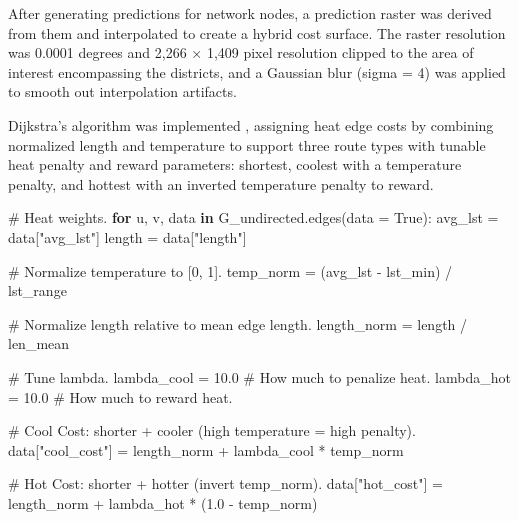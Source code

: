 \documentclass[
]{article}
\newenvironment{Shaded}{\begin{snugshade}}{\end{snugshade}}
\newcommand{\CommentTok}[1]{\textcolor[rgb]{0.37,0.37,0.37}{#1}}
\newcommand{\ControlFlowTok}[1]{\textcolor[rgb]{0.00,0.23,0.31}{\textbf{#1}}}
\newcommand{\FloatTok}[1]{\textcolor[rgb]{0.68,0.00,0.00}{#1}}
\newcommand{\KeywordTok}[1]{\textcolor[rgb]{0.00,0.23,0.31}{\textbf{#1}}}
\newcommand{\NormalTok}[1]{\textcolor[rgb]{0.00,0.23,0.31}{#1}}
\newcommand{\OperatorTok}[1]{\textcolor[rgb]{0.37,0.37,0.37}{#1}}
\newcommand{\StringTok}[1]{\textcolor[rgb]{0.13,0.47,0.30}{#1}}
\newcommand{\VariableTok}[1]{\textcolor[rgb]{0.07,0.07,0.07}{#1}}
\begin{document}
After generating predictions for network nodes, a prediction raster was derived from them and interpolated to create a hybrid cost surface. The raster resolution was 0.0001 degrees and 2,266 × 1,409 pixel resolution clipped to the area of interest encompassing the districts, and a Gaussian blur (sigma = 4) was applied to smooth out interpolation artifacts.

Dijkstra's algorithm was implemented \citep{dijkstra1959}, assigning heat edge costs by combining normalized length and temperature to support three route types with tunable heat penalty and reward parameters: shortest, coolest with a temperature penalty, and hottest with an inverted temperature penalty to reward.

\begin{Shaded}
\begin{Highlighting}[]
\CommentTok{\# Heat weights.}
\ControlFlowTok{for}\NormalTok{ u, v, data }\KeywordTok{in}\NormalTok{ G\_undirected.edges(data }\OperatorTok{=} \VariableTok{True}\NormalTok{):}
\NormalTok{    avg\_lst }\OperatorTok{=}\NormalTok{ data[}\StringTok{"avg\_lst"}\NormalTok{]}
\NormalTok{    length  }\OperatorTok{=}\NormalTok{ data[}\StringTok{"length"}\NormalTok{]}

    \CommentTok{\# Normalize temperature to [0, 1].}
\NormalTok{    temp\_norm }\OperatorTok{=}\NormalTok{ (avg\_lst }\OperatorTok{{-}}\NormalTok{ lst\_min) }\OperatorTok{/}\NormalTok{ lst\_range}

    \CommentTok{\# Normalize length relative to mean edge length.}
\NormalTok{    length\_norm }\OperatorTok{=}\NormalTok{ length }\OperatorTok{/}\NormalTok{ len\_mean}

    \CommentTok{\# Tune lambda.}
\NormalTok{    lambda\_cool }\OperatorTok{=} \FloatTok{10.0} \CommentTok{\# How much to penalize heat.}
\NormalTok{    lambda\_hot  }\OperatorTok{=} \FloatTok{10.0} \CommentTok{\# How much to reward heat.}

    \CommentTok{\# Cool Cost: shorter + cooler (high temperature = high penalty).}
\NormalTok{    data[}\StringTok{"cool\_cost"}\NormalTok{] }\OperatorTok{=}\NormalTok{ length\_norm }\OperatorTok{+}\NormalTok{ lambda\_cool }\OperatorTok{*}\NormalTok{ temp\_norm}

    \CommentTok{\# Hot Cost: shorter + hotter (invert temp\_norm).}
\NormalTok{    data[}\StringTok{"hot\_cost"}\NormalTok{] }\OperatorTok{=}\NormalTok{ length\_norm }\OperatorTok{+}\NormalTok{ lambda\_hot }\OperatorTok{*}\NormalTok{ (}\FloatTok{1.0} \OperatorTok{{-}}\NormalTok{ temp\_norm)}
\end{Highlighting}
\end{Shaded}
\end{document}
